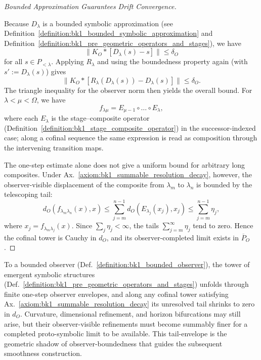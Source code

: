\begin{proof}[Bounded Approximation Guarantees Drift Convergence]
\label{proof:bk1_bounded_drift_approximation}
\leavevmode

Because \(D_\lambda\) is a bounded symbolic approximation (see Definition~\ref{definition:bk1_bounded_symbolic_approximation} and Definition~\ref{definition:bk1_pre_geometric_operators_and_stages}), we have
\[
  \lVert K_O*[D_\lambda(s)-s]\rVert \le \delta_O
\]
for all \(s\in P_{<\lambda}\). Applying \(R_\lambda\) and using the boundedness property again (with \(s' := D_\lambda(s)\)) gives
\[
  \lVert K_O*[R_\lambda(D_\lambda(s))-D_\lambda(s)]\rVert \le \delta_O.
\]
The triangle inequality for the observer norm then yields the overall bound. For \(\lambda<\mu<\Omega\), we have
\[
f_{\lambda\mu} = E_{\mu-1}\circ\dots\circ E_\lambda,
\]
where each \(E_\lambda\) is the stage--composite operator (Definition~\ref{definition:bk1_stage_composite_operator}) in the successor-indexed case; along a cofinal sequence the same expression is read as composition through the intervening transition maps.

The one-step estimate alone does not give a uniform bound for arbitrary long
composites. Under Ax.~\ref{axiom:bk1_summable_resolution_decay}, however, the
observer-visible displacement of the composite from \(\lambda_m\) to
\(\lambda_n\) is bounded by the telescoping tail:
\[
d_O(f_{\lambda_m\lambda_n}(x),x)
\leq \sum_{j=m}^{n-1}d_O(E_{\lambda_j}(x_j),x_j)
\leq \sum_{j=m}^{n-1}\eta_j,
\]
where \(x_j=f_{\lambda_m\lambda_j}(x)\). Since \(\sum_j\eta_j<\infty\), the
tails \(\sum_{j=m}^{\infty}\eta_j\) tend to zero. Hence the cofinal tower is
Cauchy in \(d_O\), and its observer-completed limit exists in
\(\overline{P}_O\).
\end{proof}
\begin{scholium}
\label{scholium:bk1_emergence_envelope}
To a bounded observer (Def.~\ref{definition:bk1_bounded_observer}), the tower of
emergent symbolic structures (Def.~\ref{definition:bk1_pre_geometric_operators_and_stages})
unfolds through finite one-step observer envelopes, and along any cofinal tower
satisfying Ax.~\ref{axiom:bk1_summable_resolution_decay} its unresolved tail
shrinks to zero in \(d_O\). Curvature, dimensional refinement, and horizon
bifurcations may still arise, but their observer-visible refinements must become
summably finer for a completed proto-symbolic limit to be available. This
tail-envelope is the geometric shadow of observer-boundedness that guides the
subsequent smoothness construction.
\end{scholium}
